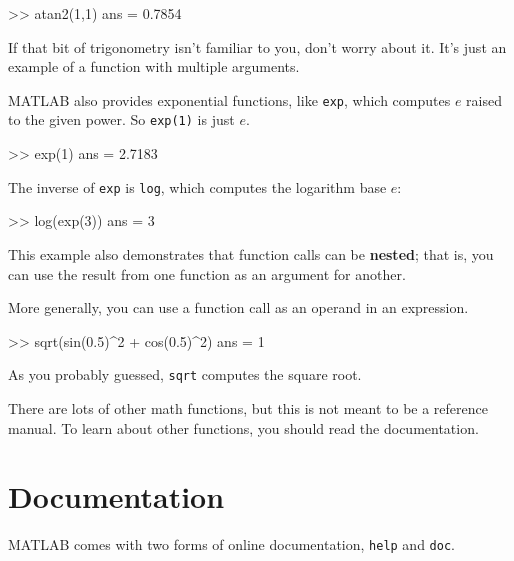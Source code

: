 \documentclass[
]{book}
\numberwithin{Answer}{chapter}
\numberwithin{Exercise}{chapter}
\begin{document}
\begin{code}
>> atan2(1,1)
ans = 0.7854
\end{code}

If that bit of trigonometry isn't familiar to you, don't worry about
it.  It's just an example of a function with multiple arguments.


MATLAB also provides exponential functions, like {\tt exp}, which computes $e$ raised to the given power.  So {\tt exp(1)} is just $e$.

\begin{code}
>> exp(1)
ans = 2.7183
\end{code}


The inverse of {\tt exp} is {\tt log}, which computes the logarithm base $e$:

\begin{code}
>> log(exp(3))
ans = 3
\end{code}

This example also demonstrates that function calls can be {\bf nested};
that is, you can use the result from one function as an argument for
another.


More generally, you can use a function call as an operand in an expression.

\begin{code}
>> sqrt(sin(0.5)^2 + cos(0.5)^2)
ans = 1
\end{code}

As you probably guessed, {\tt sqrt} computes the square root.


There are lots of other math functions, but this is not meant to
be a reference manual.  To learn about other functions, you should
read the documentation.


\section{Documentation}

MATLAB comes with two forms of online documentation, {\tt help}
and {\tt doc}.

\end{document}
